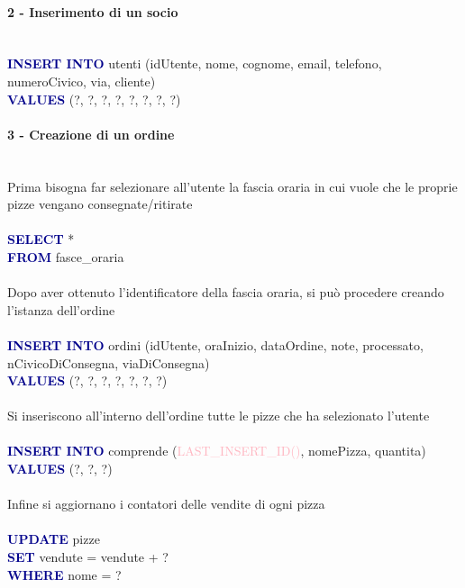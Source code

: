 \documentclass[a4paper,12pt, oneside]{article}
\begin{document}
\paragraph{2 - Inserimento di un socio}
\hphantom{A}\\    %
\textcolor{darkBlue}{\textbf{INSERT INTO}} utenti (idUtente, nome, cognome, email, telefono, numeroCivico, via, cliente)
\\\textcolor{darkBlue}{\textbf{VALUES}} (?, ?, ?, ?, ?, ?, ?, ?)

\paragraph{3 - Creazione di un ordine}
\hphantom{A}\\    %
Prima bisogna far selezionare all'utente la fascia oraria in cui vuole che le proprie pizze vengano consegnate/ritirate
\\\\
\textcolor{darkBlue}{\textbf{SELECT}} *
\\\textcolor{darkBlue}{\textbf{FROM}} fasce\_oraria
\\\\
Dopo aver ottenuto l'identificatore della fascia oraria, si può procedere creando l'istanza dell'ordine
\\\\
\textcolor{darkBlue}{\textbf{INSERT INTO}} ordini (idUtente, oraInizio, dataOrdine, note, processato, nCivicoDiConsegna, viaDiConsegna)
\\\textcolor{darkBlue}{\textbf{VALUES}} (?, ?, ?, ?, ?, ?, ?)
\\\\
Si inseriscono all'interno dell'ordine tutte le pizze che ha selezionato l'utente
\\\\
\textcolor{darkBlue}{\textbf{INSERT INTO}} comprende (\textcolor{lightPink}{LAST\_INSERT\_ID()}, nomePizza, quantita)
\\\textcolor{darkBlue}{\textbf{VALUES}} (?, ?, ?)
\\\\
Infine si aggiornano i contatori delle vendite di ogni pizza
\\\\
\textcolor{darkBlue}{\textbf{UPDATE}} pizze
\\\textcolor{darkBlue}{\textbf{SET}} vendute = vendute + ?
\\\textcolor{darkBlue}{\textbf{WHERE}} nome = ?
\end{document}
